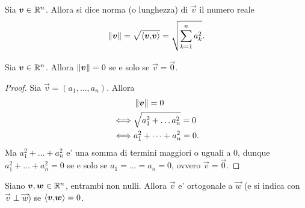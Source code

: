\begin{definition}
    Sia $\bm{v} \in \mathbb{R}^n$. Allora si dice norma (o lunghezza) di $\vec{v}$ il numero reale \[
        \left\lVert\bm{v}\right\rVert = \sqrt{\langle \bm{v}{,}\bm{v}\rangle} = \sqrt{\sum_{k = 1}^n a_k^2}.     
    \]
\end{definition}

\begin{proposition}
    \label{norma_nulla_sse_vettore_nullo}
    Sia $\bm{v} \in \mathbb{R}^n$. Allora $\left\lVert\bm{v}\right\rVert = 0$ se e solo se $\vec v = \vec 0$.
\end{proposition}
\begin{proof}
    Sia $\vec v = (a_1, \dots, a_n)$. Allora
    \begin{align*}
        &\left\lVert\bm{v}\right\rVert = 0\\
        \iff &\sqrt{a_1^2 + \dots a_n^2} = 0 \\
        \iff &a_1^2 + \dots + a_n^2 = 0.
    \end{align*}
    Ma $a_1^2 + \dots + a_n^2$ e' una somma di termini maggiori o uguali a 0, dunque $a_1^2 + \dots + a_n^2 = 0$ se e solo se $a_1 = \dots = a_n = 0$, ovvero $\vec v = \vec 0$. 
\end{proof}

\begin{definition}
    Siano $\bm{v}, \bm{w} \in \mathbb{R}^n$, entrambi non nulli. Allora $\vec v$ e' ortogonale a $\vec w$ (e si indica con $\vec v \perp \vec w$) se $\langle \bm{v}{,}\bm{w}\rangle = 0$.
\end{definition}

